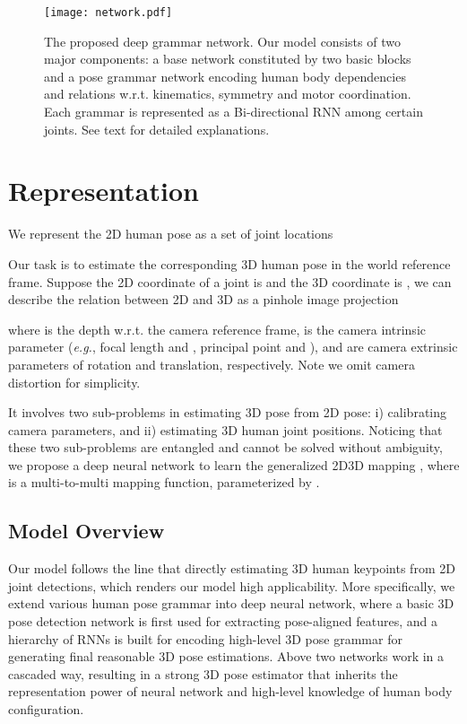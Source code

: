 \documentclass[letterpaper]{article} \usepackage{aaai18}  \usepackage{times}  \usepackage{helvet}  \usepackage{courier}  \usepackage{url}  \usepackage{color}
\begin{document}
\begin{figure*}[ptb]
\centering
\texttt{[image: network.pdf]}
\caption{The proposed deep grammar network. Our model consists of two major components: a base network constituted by two basic blocks and a pose grammar network encoding human body dependencies and relations w.r.t. kinematics, symmetry and motor coordination. Each grammar is represented as a Bi-directional RNN among certain joints. See text for detailed explanations.}
\label{fig:network}
\end{figure*}

\section{Representation} \label{sec:rep}

We represent the 2D human pose  as a set of  joint locations

Our task is to estimate the corresponding 3D human pose  in the world reference frame. Suppose the 2D coordinate of a joint  is  and the 3D coordinate  is , we can describe the relation between 2D and 3D as a pinhole image projection

where  is the depth w.r.t. the camera reference frame,  is the camera intrinsic parameter (\textit{e.g.}, focal length  and , principal point  and ),  and  are camera extrinsic parameters of rotation and translation, respectively. Note we omit camera distortion for simplicity.

It involves two sub-problems in estimating 3D pose from 2D pose: i) calibrating camera parameters, and ii) estimating 3D human joint positions. Noticing that these two sub-problems are entangled and cannot be solved without ambiguity, we propose a deep neural network to learn the generalized 2D3D mapping , where  is a multi-to-multi mapping function, parameterized by .

\subsection{Model Overview}

Our model follows the line that directly estimating 3D human keypoints from 2D joint detections, which renders our model high applicability. More specifically, we extend various human pose grammar into deep neural network, where a basic 3D pose detection network is first used for extracting pose-aligned features, and a hierarchy of RNNs is built for encoding high-level 3D pose grammar for generating final reasonable 3D pose estimations. Above two networks work in a cascaded way, resulting in a strong 3D pose estimator that inherits the representation power of neural network and high-level knowledge of human body configuration.
\end{document}
